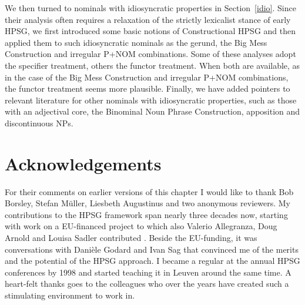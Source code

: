 \documentclass[output=paper
                ,modfonts
                ,nonflat
	        ,collection
	        ,collectionchapter
	        ,collectiontoclongg
 	        ,biblatex
                ,babelshorthands
                ,newtxmath
                ,draftmode
                ,colorlinks, citecolor=brown
]{./langsci/langscibook}
\begin{document}
We then turned to nominals with idiosyncratic properties in Section~\ref{idio}.
Since their analysis often requires a relaxation of the strictly lexicalist stance of early HPSG, 
we first introduced some basic notions of Constructional HPSG and then applied them to 
such idiosyncratic nominals as the gerund, the Big Mess Construction and irregular P+NOM combinations.  
Some of these analyses adopt the specifier treatment, others the functor treatment. 
When both are available, as in the case of the Big Mess Construction and  
irregular P+NOM combinations, the functor treatment seems more plausible. 
Finally, we have added pointers to relevant literature for other nominals with idiosyncratic properties,
such as those with an adjectival core, the Binominal Noun Phrase Construction, apposition 
and discontinuous NPs. 

 
\section*{Acknowledgements}


For their comments on earlier versions of this chapter I would like to thank Bob Borsley, Stefan
Müller, Liesbeth Augustinus and two anonymous reviewers. My contributions to the HPSG framework span
nearly three decades now, starting with work on a EU-financed project to which
also Valerio Allegranza, Doug Arnold and Louisa Sadler contributed \citep{VanEyndeSchmidt98}. 
Beside the EU-funding, it was conversations with Dani\`ele Godard and Ivan Sag that convinced me 
of the merits and the potential of the HPSG approach.  
I became a regular at the annual HPSG conferences by 1998 and started teaching it in Leuven around 
the same time. A heart-felt thanks goes to the colleagues who over the years have created such a stimulating
environment to work in.        

{\sloppy
\printbibliography[heading=subbibliography,notkeyword=this] 
}
\end{document}
